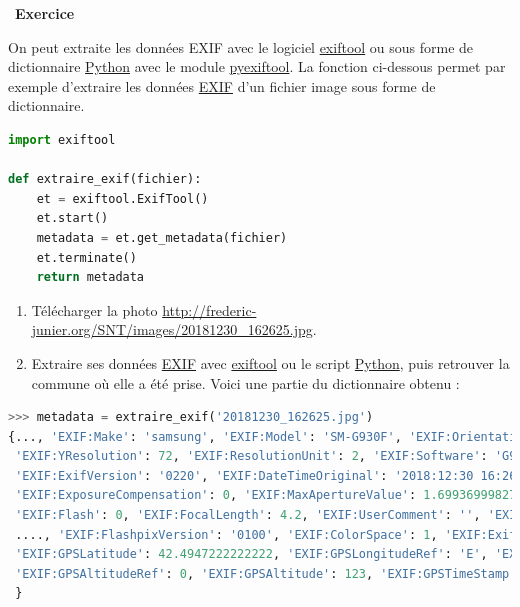 \documentclass[
  11pt,
]{article}
\providecommand{\tightlist}{%
  \setlength{\itemsep}{0pt}\setlength{\parskip}{0pt}}
\newcounter{exo}
\newenvironment{exercice}[1]
{\par \medskip   \addtocounter{exo}{1} \noindent  
\begin{bclogo}[arrondi =0.1,   noborder = true, logo=\bccrayon, marge=4]{~\textbf{Exercice} \textbf{\theexo} {\itshape #1} }  \par}
{
\end{bclogo}
 \par \bigskip }
\newcounter{def}
\newcounter{logi}
\begin{document}
\begin{exercice}{}

On peut extraite les données EXIF avec le logiciel
\href{https://exiftool.org/}{exiftool} ou sous forme de dictionnaire
\href{https://docs.python.org/3/tutorial/datastructures.html}{Python}
avec le module
\href{https://smarnach.githeub.io/pyexiftool/}{pyexiftool}. La fonction
ci-dessous permet par exemple d'extraire les données
\href{https://fr.wikipedia.org/wiki/Exchangeable_image_file_format}{EXIF}
d'un fichier image sous forme de dictionnaire.

\begin{lstlisting}[language=Python]
import exiftool

def extraire_exif(fichier):
    et = exiftool.ExifTool()
    et.start()
    metadata = et.get_metadata(fichier)
    et.terminate()
    return metadata
\end{lstlisting}

\begin{enumerate}
\def\labelenumi{\arabic{enumi}.}
\tightlist
\item
  Télécharger la photo
  \url{http://frederic-junier.org/SNT/images/20181230_162625.jpg}.
\item
  Extraire ses données
  \href{https://fr.wikipedia.org/wiki/Exchangeable_image_file_format}{EXIF}
  avec \href{https://exiftool.org/}{exiftool} ou le script
  \href{https://docs.python.org/3/tutorial/datastructures.html}{Python},
  puis retrouver la commune où elle a été prise. Voici une partie du
  dictionnaire obtenu :
\end{enumerate}

\begin{lstlisting}[language=Python]
>>> metadata = extraire_exif('20181230_162625.jpg')
{..., 'EXIF:Make': 'samsung', 'EXIF:Model': 'SM-G930F', 'EXIF:Orientation': 1, 'EXIF:XResolution': 72,
 'EXIF:YResolution': 72, 'EXIF:ResolutionUnit': 2, 'EXIF:Software': 'G930FXXU3ERL3', 'EXIF:ModifyDate': '2018:12:30 16:26:24', 'EXIF:YCbCrPositioning': 1, 'EXIF:ExposureTime': 0.0005733944954, 'EXIF:FNumber': 1.7, 'EXIF:ExposureProgram': 2, 'EXIF:ISO': 50,
 'EXIF:ExifVersion': '0220', 'EXIF:DateTimeOriginal': '2018:12:30 16:26:24', 'EXIF:CreateDate': '2018:12:30 16:26:24', 'EXIF:ComponentsConfiguration': '1 2 3 0', 'EXIF:ShutterSpeedValue': '0.000572673315054629', 'EXIF:ApertureValue': 1.6993699982773, 'EXIF:BrightnessValue': 8.36,
 'EXIF:ExposureCompensation': 0, 'EXIF:MaxApertureValue': 1.6993699982773, 'EXIF:MeteringMode': 2,
 'EXIF:Flash': 0, 'EXIF:FocalLength': 4.2, 'EXIF:UserComment': '', 'EXIF:SubSecTime': '0999',
 ...., 'EXIF:FlashpixVersion': '0100', 'EXIF:ColorSpace': 1, 'EXIF:ExifImageWidth': 4032, 'EXIF:ExifImageHeight': 3024, ..., 'EXIF:GPSVersionID': '2 2 0 0', 'EXIF:GPSLatitudeRef': 'N',
 'EXIF:GPSLatitude': 42.4947222222222, 'EXIF:GPSLongitudeRef': 'E', 'EXIF:GPSLongitude': 3.13,
 'EXIF:GPSAltitudeRef': 0, 'EXIF:GPSAltitude': 123, 'EXIF:GPSTimeStamp': '15:26:35','EXIF:GPSDateStamp': '2018:12:30', ....
 }
\end{lstlisting}

\end{exercice}
\end{document}
